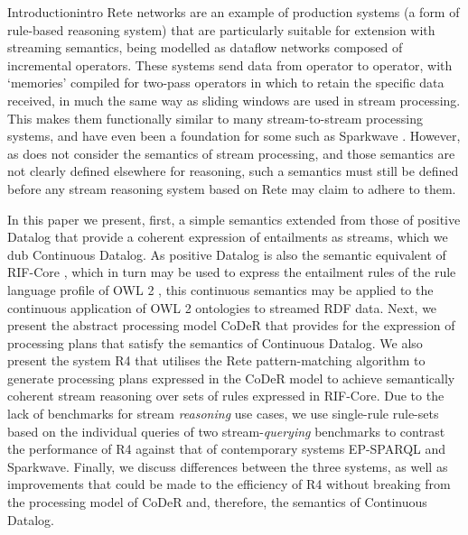 \begin{nestedsection}{Introduction}{intro}
	Rete networks \citep{forgy79} are an example of production systems (a form of rule-based reasoning system) that are particularly suitable for extension with streaming semantics, being modelled as dataflow networks composed of incremental operators.
	These systems send data from operator to operator, with `memories' compiled for two-pass operators in which to retain the specific data received, in much the same way as sliding windows are used in stream processing.
	This makes them functionally similar to many stream-to-stream processing systems, and have even been a foundation for some such as Sparkwave \citep{sparkwave}.
	However, as \citep{forgy79} does not consider the semantics of stream processing, and those semantics are not clearly defined elsewhere for reasoning, such a semantics must still be defined before any stream reasoning system based on Rete may claim to adhere to them.

	In this paper we present, first, a simple semantics extended from those of positive Datalog that provide a coherent expression of entailments as streams, which we dub Continuous Datalog.
	As positive Datalog is also the semantic equivalent of RIF-Core \citep{w3crifcore}, which in turn may be used to express the entailment rules of the rule language profile of OWL 2 \citep{w3cowl2profiles}, this continuous semantics may be applied to the continuous application of OWL 2 ontologies to streamed RDF data.
	Next, we present the abstract processing model CoDeR that provides for the expression of processing plans that satisfy the semantics of Continuous Datalog.
	We also present the system R4 that utilises the Rete pattern-matching algorithm to generate processing plans expressed in the CoDeR model to achieve semantically coherent stream reasoning over sets of rules expressed in RIF-Core.
	Due to the lack of benchmarks for stream \emph{reasoning} use cases, we use single-rule rule-sets based on the individual queries of two stream-\emph{querying} benchmarks to contrast the performance of R4 against that of contemporary systems EP-SPARQL and Sparkwave.
	Finally, we discuss differences between the three systems, as well as improvements that could be made to the efficiency of R4 without breaking from the processing model of CoDeR and, therefore, the semantics of Continuous Datalog.
\end{nestedsection}
